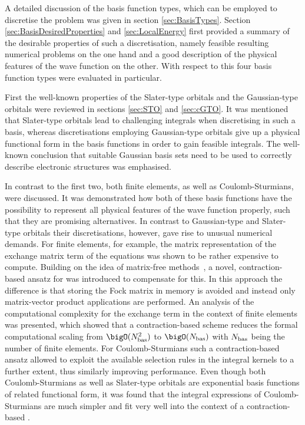 
\pagebreak
A detailed discussion of the basis function types,
which can be employed to discretise the \HF problem
was given in section \ref{sec:BasisTypes}.
Section \ref{sec:BasisDesiredProperties} and \ref{sec:LocalEnergy}
first provided a summary of the desirable properties of such a discretisation,
namely feasible resulting numerical problems on the one hand
and a good description of the physical features of the wave function
on the other.
With respect to this
four basis function types were evaluated in particular.

First the well-known properties of the Slater-type orbitals
and the Gaussian-type orbitals were reviewed
in sections \ref{sec:STO} and \ref{sec:cGTO}.
It was mentioned that Slater-type orbitals lead to challenging
integrals when discretising \HF in such a basis,
whereas discretisations employing Gaussian-type orbitals
give up a physical functional form in the basis functions
in order to gain feasible integrals.
The well-known conclusion
that suitable Gaussian basis sets need to be used to correctly
describe electronic structures was emphasised.

In contrast to the first two,
both finite elements,
as well as Coulomb-Sturmians,
were discussed.
It was demonstrated how both of these basis functions have the possibility
to represent all physical features of the wave function properly,
such that they are promising alternatives.
In contrast to Gaussian-type and Slater-type orbitals
their discretisations, however,
gave rise to unusual numerical demands.
For finite elements, for example,
the matrix representation of the exchange matrix term of the \HF equations
was shown to be rather expensive to compute.
Building on the idea of matrix-free methods~\cite{Kronbichler2012},
a novel, contraction-based ansatz for \HF was introduced
to compensate for this.
In this approach the difference is that storing the Fock matrix in memory
is avoided and instead only matrix-vector product applications are performed.
An analysis of the computational complexity
for the exchange term in the context of finite elements was presented,
which showed that a contraction-based scheme
reduces the formal computational scaling from $\bigO(\Nbas^2)$
to $\bigO(\Nbas)$ with $N_\text{bas}$ being the number of finite elements.
For Coulomb-Sturmians such a contraction-based \SCF ansatz
allowed to exploit the available selection rules in the integral kernels
to a further extent,
thus similarly improving performance.
Even though both Coulomb-Sturmians as well as Slater-type
orbitals are exponential basis functions
of related functional form,
it was found that the integral expressions of Coulomb-Sturmians are much simpler
and fit very well into the context of a contraction-based \SCF.


